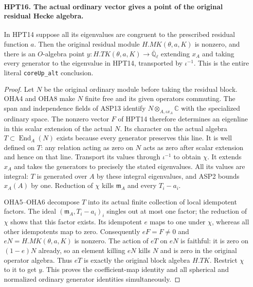 \paragraph{HPT16. The actual ordinary vector gives a point of the original residual Hecke algebra.}
\label{claim:HPT16}
In HPT14 suppose all its eigenvalues are congruent to the prescribed
residual function $a$.  Then the original residual module
$H.MK(\theta,a,K)$ is nonzero, and there is an $O$-algebra point
$y:H.TK(\theta,a,K)\to\overline{\mathbb Q}_\ell$ extending $x_A$
and taking every generator to the eigenvalue in HPT14, transported
by $\iota^{-1}$.  This is the entire literal
\texttt{coreUp\_alt} conclusion.
\begin{proof}
Let $N$ be the original ordinary module before taking the residual
block.  OHA4 and OHA8 make $N$ finite free and its given operators
commuting.  The span and independence fields of ASP13 identify
$N\otimes_{A,\iota x_A}\mathbb C$ with the specialized ordinary
space.  The nonzero vector $F$ of HPT14 therefore determines an
eigenline in this scalar extension of the actual $N$.
Its character on the actual algebra $T\subset\operatorname{End}_A(N)$
exists because every generator preserves this line.  It is
well defined on $T$: any relation acting as zero on $N$ acts
as zero after scalar extension and hence on that line.
Transport its values through $\iota^{-1}$ to obtain $\chi$.
It extends $x_A$ and takes the generators to precisely the stated
eigenvalues.  All its values are integral: $T$ is generated over
$A$ by these integral eigenvalues, and ASP2 bounds $x_A(A)$ by one.
Reduction of $\chi$ kills $\mathfrak m_A$ and every $T_i-a_i$.

OHA5--OHA6 decompose $T$ into its actual finite collection of
local idempotent factors.  The ideal
$(\mathfrak m_A,T_i-a_i)_i$ singles out at most one factor; the
reduction of $\chi$ shows that this factor exists.  Its idempotent
$e$ maps to one under $\chi$, whereas all other idempotents map
to zero.  Consequently $eF=F\ne0$ and $eN=H.MK(\theta,a,K)$
is nonzero.  The action of $eT$ on $eN$ is faithful: it is zero
on $(1-e)N$ already, so an element killing $eN$ kills $N$ and
is zero in the original operator algebra.  Thus $eT$ is exactly
the original block algebra $H.TK$.  Restrict $\chi$ to it to get
$y$.  This proves the coefficient-map identity and all spherical
and normalized ordinary generator identities simultaneously.
\end{proof}

